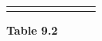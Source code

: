 {{\begin{center}
\begin{tabular}[t]{|l|l|l|l|l|l|l|l|}
    
         &
    
    
         &
    
    
         &
    
    
         &
    
    
         &
    
    
     \tabularnewline\cline{1-1}\cline{2-2}\cline{3-3}\cline{4-4}\cline{5-5}\cline{6-6}\cline{7-7}\cline{8-8}
    \end{tabular}
      \end{center}
    \begin{center}{\small\bfseries Table 9.2}\end{center}
    
    \addtocounter{footnote}{-0}
    
          }{ %
        
    
        \begin{center}
      

\end{center}}}
